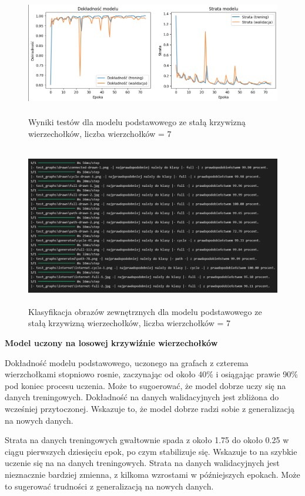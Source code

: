 \begin{figure}[ht]
	\centering
	\includegraphics[height=5.5cm]{resources/tests/images/v2/base7_img.png}
	\caption{Wyniki testów dla modelu podstawowego ze stałą krzywizną wierzechołków, liczba wierzchołków = 7}
	\label{Fig:tests-base-1}
\end{figure}
\FloatBarrier

\begin{figure}[ht]
	\centering
	\includegraphics[height=7cm]{resources/tests/images/v2/base7_txt.png}
	\caption{Klasyfikacja obrazów zewnętrznych dla modelu podstawowego ze stałą krzywizną wierzechołków, liczba wierzchołków = 7}
	\label{Fig:tests-base-2}
\end{figure}
\FloatBarrier

\textbf{Model uczony na losowej krzywiźnie wierzechołków}

Dokładność modelu podstawowego, uczonego na grafach z czterema wierzchołkami stopniowo rosnie,
zaczynając od około 40\% i osiągając prawie 90\% pod koniec procesu uczenia.
Może to sugoerować, że model dobrze uczy się na danych treningowych.
Dokładność na danych walidacyjnych jest zbliżona do wcześniej przytoczonej.
Wskazuje to, że model dobrze radzi sobie z generalizacją na nowych danych.

Strata na danych treningowych gwałtownie spada z około 1.75 do około 0.25 w ciągu pierwszych dziesięciu epok,
po czym stabilizuje się.
Wskazuje to na szybkie uczenie się na na danych treningowych.
Strata na danych walidacyjnych jest nieznacznie bardziej zmienna,
z kilkoma wzrostami w późniejszych epokach.
Może to sugerować trudności z generalizacją na nowych danych.

